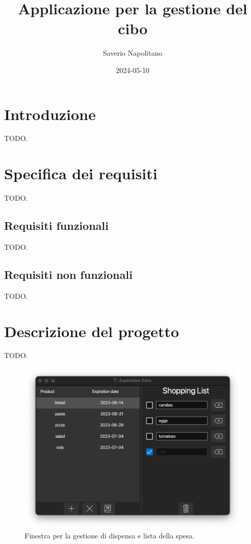 \documentclass{article}
\title{Applicazione per la gestione del cibo}
\date{2024-05-10}
\author{Saverio Napolitano}
\begin{document}
\maketitle


\newpage


\section{Introduzione}

TODO.

\section{Specifica dei requisiti}

TODO.

\subsection{Requisiti funzionali}

TODO.

\subsection{Requisiti non funzionali}

TODO.

\section{Descrizione del progetto}

TODO.

\begin{figure}[H]
    \includegraphics[width=\linewidth]{images/main-view.png}
    \caption{Finestra per la gestione di dispensa e lista della spesa.}
    \label{fig:mainview}
\end{figure}
\end{document}
